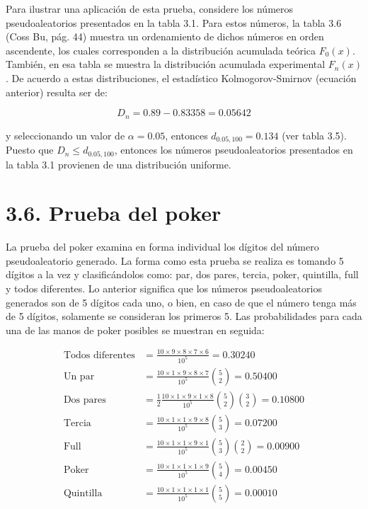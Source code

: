 \documentclass[11pt,letterpaper]{report}
\begin{document}
Para ilustrar una aplicación de esta prueba, considere los números
pseudoaleatorios presentados en la tabla 3.1. Para estos números, la
tabla 3.6 (Coss Bu, pág. 44) muestra un ordenamiento de dichos números
en orden ascendente, los cuales corresponden a la distribución acumulada
teórica $F_0(x)$. También, en esa tabla se muestra la distribución
acumulada experimental $F_n(x)$. De acuerdo a estas distribuciones, el
estadístico Kolmogorov-Smirnov (ecuación anterior) resulta ser de:

\begin{equation}
D_n = 0.89 - 0.83358 = 0.05642
\end{equation}

y seleccionando un valor de $\alpha=0.05$, entonces $d_{0.05,100} =
0.134$ (ver tabla 3.5). Puesto que $D_n \le d_{0.05,100}$, entonces los
números pseudoaleatorios presentados en la tabla 3.1 provienen de una
distribución uniforme.

\section*{3.6. Prueba del poker}

La prueba del poker examina en forma individual los dígitos del número
pseudoaleatorio generado. La forma como esta prueba se realiza es
tomando 5 dígitos a la vez y clasificándolos como: par, dos pares,
tercia, poker, quintilla, full y todos diferentes. Lo anterior significa
que los números pseudoaleatorios generados son de 5 dígitos cada uno, o
bien, en caso de que el número tenga más de 5 dígitos, solamente se
consideran los primeros 5. Las probabilidades para cada una de las manos
de poker posibles se muestran en seguida:

\begin{align*}
\text{Todos diferentes} &= \frac{10\times 9\times 8\times 7\times 6}{10^5} = 0.30240 \\
\text{Un par} &= \frac{10\times 1\times 9\times 8\times 7}{10^5}\binom{5}{2} = 0.50400 \\
\text{Dos pares} &= \frac{1}{2}\frac{10\times 1\times 9\times 1\times 8}{10^5}\binom{5}{2}\binom{3}{2} = 0.10800 \\
\text{Tercia} &= \frac{10\times 1\times 1\times 9\times 8}{10^5}\binom{5}{3} = 0.07200 \\
\text{Full} &= \frac{10\times 1\times 1\times 9\times 1}{10^5}\binom{5}{3}\binom{2}{2} = 0.00900 \\
\text{Poker} &= \frac{10\times 1\times 1\times 1\times 9}{10^5}\binom{5}{4} = 0.00450 \\
\text{Quintilla} &= \frac{10\times 1\times 1\times 1\times 1}{10^5}\binom{5}{5} = 0.00010
\end{align*}
\end{document}
